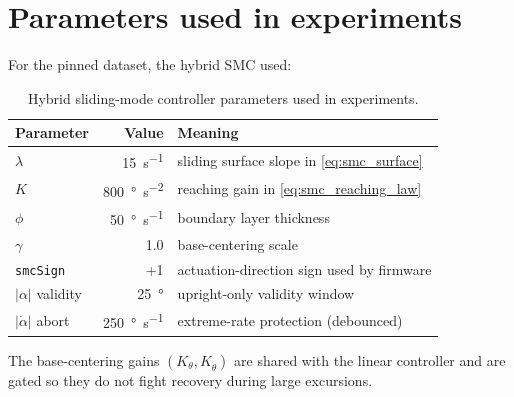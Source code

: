 \section{Parameters used in experiments}
For the pinned dataset, the hybrid SMC used:
\begin{table}[htbp]
  \centering
  \small
  \setlength{\tabcolsep}{5pt}
  \caption{Hybrid sliding-mode controller parameters used in experiments.}
  \label{tab:smc_params}
  \begin{tabular}{lrl}
    \toprule
    Parameter & Value & Meaning \\
    \midrule
    $\lambda$ & 15\ \si{s^{-1}} & sliding surface slope in \eqref{eq:smc_surface} \\
    $K$ & 800\ \si{\degree\per\second\squared} & reaching gain in \eqref{eq:smc_reaching_law} \\
    $\phi$ & 50\ \si{\degree\per\second} & boundary layer thickness \\
    $\gamma$ & 1.0 & base-centering scale \\
    \texttt{smcSign} & +1 & actuation-direction sign used by firmware \\
    \midrule
    $|\alpha|$ validity & \SI{25}{\degree} & upright-only validity window \\
    $|\dot{\alpha}|$ abort & \SI{250}{\degree\per\second} & extreme-rate protection (debounced) \\
    \bottomrule
  \end{tabular}
\end{table}
The base-centering gains $(K_\theta,K_{\dot{\theta}})$ are shared with the linear controller and are gated so they do not fight recovery during large excursions.

